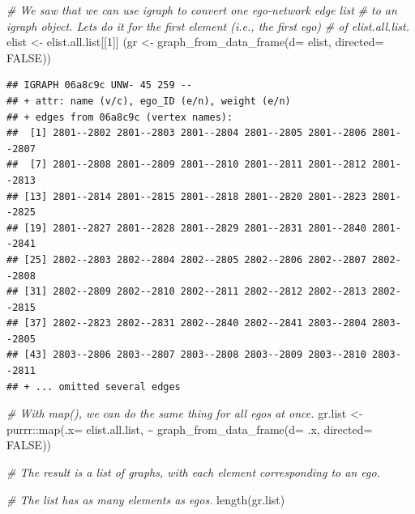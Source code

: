 \documentclass[
]{book}
\newenvironment{Shaded}{\begin{snugshade}}{\end{snugshade}}
\newcommand{\AttributeTok}[1]{\textcolor[rgb]{0.77,0.63,0.00}{#1}}
\newcommand{\CommentTok}[1]{\textcolor[rgb]{0.56,0.35,0.01}{\textit{#1}}}
\newcommand{\ConstantTok}[1]{\textcolor[rgb]{0.00,0.00,0.00}{#1}}
\newcommand{\DecValTok}[1]{\textcolor[rgb]{0.00,0.00,0.81}{#1}}
\newcommand{\FunctionTok}[1]{\textcolor[rgb]{0.00,0.00,0.00}{#1}}
\newcommand{\NormalTok}[1]{#1}
\newcommand{\OtherTok}[1]{\textcolor[rgb]{0.56,0.35,0.01}{#1}}
\newcommand{\SpecialCharTok}[1]{\textcolor[rgb]{0.00,0.00,0.00}{#1}}
\begin{document}
\begin{Shaded}
\begin{Highlighting}[]
\CommentTok{\# We saw that we can use igraph to convert one ego{-}network edge list}
\CommentTok{\# to an igraph object. Let\textquotesingle{}s do it for the first element (i.e., the first ego)}
\CommentTok{\# of elist.all.list.}
\NormalTok{elist }\OtherTok{\textless{}{-}}\NormalTok{ elist.all.list[[}\DecValTok{1}\NormalTok{]]}
\NormalTok{(gr }\OtherTok{\textless{}{-}} \FunctionTok{graph\_from\_data\_frame}\NormalTok{(}\AttributeTok{d=}\NormalTok{ elist, }\AttributeTok{directed=} \ConstantTok{FALSE}\NormalTok{))}
\end{Highlighting}
\end{Shaded}

\begin{verbatim}
## IGRAPH 06a8c9c UNW- 45 259 -- 
## + attr: name (v/c), ego_ID (e/n), weight (e/n)
## + edges from 06a8c9c (vertex names):
##  [1] 2801--2802 2801--2803 2801--2804 2801--2805 2801--2806 2801--2807
##  [7] 2801--2808 2801--2809 2801--2810 2801--2811 2801--2812 2801--2813
## [13] 2801--2814 2801--2815 2801--2818 2801--2820 2801--2823 2801--2825
## [19] 2801--2827 2801--2828 2801--2829 2801--2831 2801--2840 2801--2841
## [25] 2802--2803 2802--2804 2802--2805 2802--2806 2802--2807 2802--2808
## [31] 2802--2809 2802--2810 2802--2811 2802--2812 2802--2813 2802--2815
## [37] 2802--2823 2802--2831 2802--2840 2802--2841 2803--2804 2803--2805
## [43] 2803--2806 2803--2807 2803--2808 2803--2809 2803--2810 2803--2811
## + ... omitted several edges
\end{verbatim}

\begin{Shaded}
\begin{Highlighting}[]
\CommentTok{\# With map(), we can do the same thing for all egos at once.}
\NormalTok{gr.list }\OtherTok{\textless{}{-}}\NormalTok{ purrr}\SpecialCharTok{::}\FunctionTok{map}\NormalTok{(}\AttributeTok{.x=}\NormalTok{ elist.all.list, }
                      \SpecialCharTok{\textasciitilde{}} \FunctionTok{graph\_from\_data\_frame}\NormalTok{(}\AttributeTok{d=}\NormalTok{ .x, }\AttributeTok{directed=} \ConstantTok{FALSE}\NormalTok{))}

\CommentTok{\# The result is a list of graphs, with each element corresponding to an ego.}

\CommentTok{\# The list has as many elements as egos.}
\FunctionTok{length}\NormalTok{(gr.list)}
\end{Highlighting}
\end{Shaded}
\end{document}
